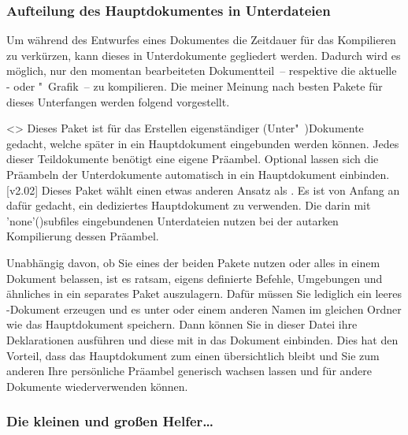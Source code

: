 \subsubsection{%
  Aufteilung des Hauptdokumentes in Unterdateien%
}

Um während des Entwurfes eines Dokumentes die Zeitdauer für das Kompilieren zu 
verkürzen, kann dieses in Unterdokumente gegliedert werden. Dadurch wird es 
möglich, nur den momentan bearbeiteten Dokumentteil~-- respektive die aktuelle 
- oder "~Grafik~-- zu kompilieren. Die meiner 
Meinung nach besten Pakete für dieses Unterfangen werden folgend vorgestellt.

\begin{DeclarePackages}
<>
  Dieses Paket ist für das Erstellen eigenständiger (Unter"~)Dokumente gedacht, 
  welche später in ein Hauptdokument eingebunden werden können. Jedes dieser 
  Teildokumente benötigt eine eigene Präambel. Optional lassen sich die 
  Präambeln der Unterdokumente automatisch in ein Hauptdokument einbinden.
[v2.02]
  Dieses Paket wählt einen etwas anderen Ansatz als . Es 
  ist von Anfang an dafür gedacht, ein dediziertes Hauptdokument zu verwenden. 
  Die darin mit \Macro'none'(){subfiles} eingebundenen 
  Unterdateien nutzen bei der autarken Kompilierung dessen Präambel.
\end{DeclarePackages}

Unabhängig davon, ob Sie eines der beiden Pakete nutzen oder alles in einem 
Dokument belassen, ist es ratsam, eigens definierte Befehle, Umgebungen und 
ähnliches in ein separates Paket auszulagern. Dafür müssen Sie lediglich ein 
leeres -Dokument erzeugen und es unter  
oder einem anderen Namen im gleichen Ordner wie das Hauptdokument speichern. 
Dann können Sie in dieser Datei ihre Deklarationen ausführen und diese mit 
 in das Dokument einbinden. Dies 
hat den Vorteil, dass das Hauptdokument zum einen übersichtlich bleibt und Sie 
zum anderen Ihre persönliche Präambel generisch wachsen lassen und für andere 
Dokumente wiederverwenden können.



\subsubsection{Die kleinen und großen Helfer\dots}

